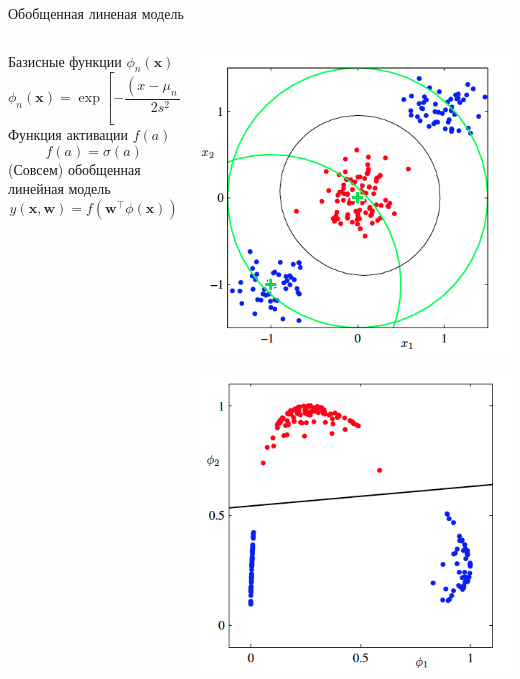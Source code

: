 \documentclass[10pt]{beamer}
\begin{document}
\begin{frame}{Обобщенная линеная модель}

\begin{columns}[T]
    \begin{column}{.5\textwidth}
    \vspace{2em}
	Базисные функции $\phi_n(\mathbf{x})$
\[
\phi_n(\mathbf{x}) = \exp\left[ -\frac{(x - \mu_n)^2}{2 s^2}\right]
\]
Функция активации $f(a)$
\[
f(a) = \sigma(a)
\]
(Совсем) обобщенная линейная модель
\[
y(\mathbf{x}, \mathbf{w}) = f(\mathbf{w}^\top \phi(\mathbf{x}))
\]

    \end{column}
       
    \begin{column}{.5\textwidth}
    \vspace{-2em}
	\begin{center}
   		\includegraphics[scale=0.25]{images/nl.png}
   		
   		\includegraphics[scale=0.25]{images/l.png}
    \end{center}
    \end{column}
  \end{columns}

\end{frame}
\end{document}
